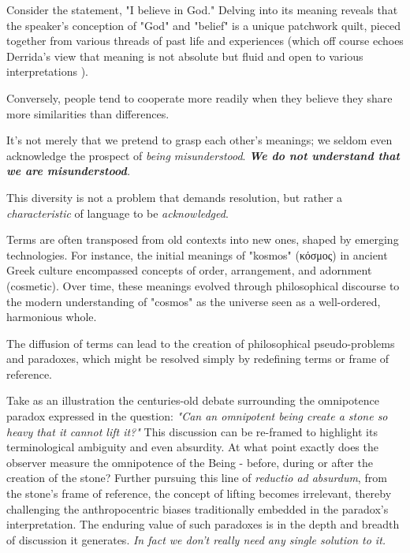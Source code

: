 \documentclass[11pt,a4]{article}
\newcommand{\textgreek}[1]{\begingroup\fontencoding{LGR}\selectfont#1\endgroup}
\begin{document}
        Consider the statement, "I believe in God." Delving into its meaning reveals that the speaker's conception of "God" and "belief" is a unique patchwork quilt, pieced together from various threads of past life and experiences (which off course echoes Derrida's view that meaning is not absolute but fluid and open to various interpretations \cite{Deconstruction}).

        Conversely, people tend to cooperate more readily when they believe they share more similarities than differences.

        \par
        It's not merely that we pretend to grasp each other's meanings; we seldom even acknowledge the prospect of \textit{being misunderstood}.  \textit{\textbf{We do not understand that we are misunderstood}.}

        \par
        This diversity is not a problem that demands resolution, but rather a \textit{characteristic} of language to be \textit{acknowledged}.

        \par
        Terms are often transposed from old contexts into new ones, shaped by emerging technologies.
        For instance,  the initial meanings of "kosmos" (\textgreek{κόσμος}) in ancient Greek culture encompassed concepts of order, arrangement, and adornment (cosmetic). Over time, these meanings evolved through philosophical discourse to the modern understanding of "cosmos" as the universe seen as a well-ordered, harmonious whole.
        \par
        The diffusion of  terms can lead to the creation of philosophical pseudo-problems and paradoxes, which might be resolved simply by redefining terms or frame of reference.
        \par

        Take as an illustration the centuries-old debate surrounding the
        omnipotence paradox expressed in the question: \textit{"Can an omnipotent being create a stone so heavy that it cannot lift it?"} This discussion can be re-framed to highlight its terminological ambiguity and even absurdity.
        At what point exactly does the observer measure the omnipotence of the Being - before, during or after the creation of the stone?
        Further pursuing this line of \textit{reductio ad absurdum}, from the stone's frame of reference, the concept of lifting becomes irrelevant, thereby challenging the anthropocentric biases traditionally embedded in the paradox’s interpretation.
        The enduring value of such paradoxes is in the depth and breadth of discussion it generates. \textit{In fact we don't really need any single solution to it.}
        \par
\end{document}
